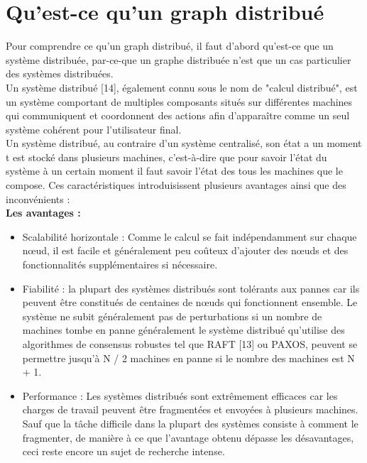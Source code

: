 \section{Qu’est-ce qu’un graph distribué}
Pour comprendre ce qu’un graph distribué, il faut d’abord qu’est-ce que un système distribuée, par-ce-que un graphe distribuée n’est que un cas particulier des systèmes distribuées.\\
Un système distribué [14], également connu sous le nom de "calcul distribué", est un système comportant de multiples composants situés sur différentes machines qui communiquent et coordonnent des actions afin d'apparaître comme un seul système cohérent pour l'utilisateur final.\\
Un système distribué, au contraire d’un système centralisé, son état a un moment t est stocké dans plusieurs machines, c’est-à-dire que pour savoir l’état du système à un certain moment il faut savoir l’état des tous les machines que le compose. Ces caractéristiques introduisissent plusieurs avantages ainsi que des inconvénients :\\

\textbf{Les avantages :}
\begin{itemize}[label=\textbullet]
\item  Scalabilité horizontale : Comme le calcul se fait indépendamment sur chaque nœud, il est facile et généralement peu coûteux d'ajouter des nœuds et des fonctionnalités supplémentaires si nécessaire.\\
\item  Fiabilité : la plupart des systèmes distribués sont tolérants aux pannes car ils peuvent être constitués de centaines de nœuds qui fonctionnent ensemble. Le système ne subit généralement pas de perturbations si un nombre de machines tombe en panne généralement le système distribué qu’utilise des algorithmes de consensus robustes tel que RAFT [13] ou PAXOS, peuvent se permettre jusqu’à N / 2 machines en panne si le nombre des machines est N + 1.
\item  Performance : Les systèmes distribués sont extrêmement efficaces car les charges de travail peuvent être fragmentées et envoyées à plusieurs machines. Sauf que la tâche difficile dans la plupart des systèmes consiste à comment le fragmenter, de manière à ce que l’avantage obtenu dépasse les désavantages, ceci reste encore un sujet de recherche intense.
\end{itemize}


